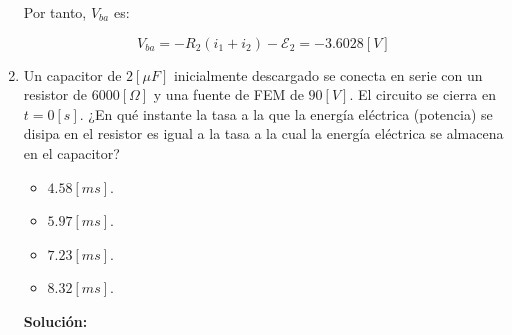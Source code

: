 \documentclass[letter,11pt]{article}
\begin{document}
\begin{enumerate}
Por tanto, $V_{ba}$ es:

\begin{equation*}
    V_{ba} = -R_2(i_1+i_2)-\mathcal{E}_2 = -3.6028 [V]
\end{equation*}

\item Un capacitor de $2 [\mu F]$ inicialmente descargado se conecta en serie
con un resistor de $6000 [\Omega]$ y una fuente de FEM de $90 [V]$. El circuito
se cierra en $t = 0 [s]$. ¿En qué instante la tasa a la que la energía eléctrica
(potencia) se disipa en el resistor es igual a la tasa a la cual la energía
eléctrica se almacena en el capacitor?

\begin{itemize}
    \item $4.58 [ms]$.
    \item $5.97 [ms]$.
    \item $7.23 [ms]$.
    \item $8.32 [ms]$.
\end{itemize}

\textbf{Solución:}

\end{enumerate}
\end{document}
